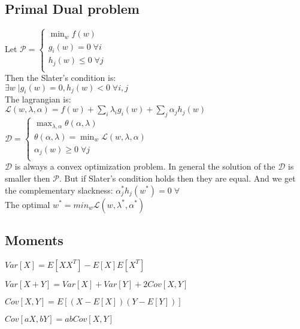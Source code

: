 \subsection*{Primal Dual problem}
Let \(\mathcal{P} = 
	\begin{cases}
		\min_w f(w)\\
		g_i(w)=0\;\forall i\\
		h_j(w)\leq 0\;\forall j\\
	\end{cases}
	\)\\
Then the Slater's condition is:\\
\(\exists w\; \vert g_i(w) = 0, h_j (w) < 0 \;\forall i,j\)\\
The lagrangian is:\\
\(\mathcal{L}(w,\lambda,\alpha)=f(w) + \sum_i\lambda_ig_i(w) + \sum_j \alpha_jh_j(w)\)\\
\(\mathcal{D} = 	
\begin{cases}
	\max_{\lambda,\alpha} \theta(\alpha, \lambda)\\
	\theta(\alpha, \lambda) = \min_w \mathcal{L}(w,\lambda,\alpha)\\
	\alpha_j(w)\geq 0\;\forall j\\
\end{cases}
\)\\
$\mathcal{D}$ is always a convex optimization problem.
In general the solution of the \(\mathcal{D}\) is smaller then $\mathcal{P}$. But if Slater's condition holds then they are equal. And we get the complementary slackness: \(\alpha_j^*h_j(w^*) = 0\;\forall\) \\
 The optimal $w^{*} = min_w {\mathcal{L}(w,\lambda^*,\alpha^*)}$

\subsection*{Moments}
\begin{inparaitem}[\color{red}\textbullet]
\item $Var[X]=E[XX^T]-E[X]E[X^T]$ \\
\item $Var[X{+}Y]=Var[X]{+}Var[Y]{+}2Cov[X,Y]$ \\
\item $Cov[X,Y] = E[(X - E[X])(Y - E[Y])]$ \\
\item $Cov[aX,bY]{=}abCov[X,Y]$ \\
\end{inparaitem}
